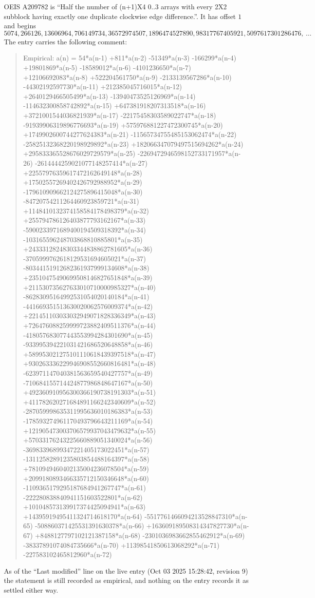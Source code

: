 \documentclass[11pt,a4paper]{article}
\theoremstyle{plain}
\theoremstyle{definition}
\begin{document}
OEIS A209782 is ``Half the number of (n+1)X4 0..3 arrays with every 2X2 subblock having exactly one duplicate clockwise edge difference.''. It has offset $1$ and begins
\[
5074, 266126, 13606964, 706149734, 36572974507, 1896474527890, 98317767405921, 5097617301286476,\ \dots
\]
The entry carries the following comment:
\begin{quote}\small
Empirical: a(n) = 54*a(n-1) +811*a(n-2) -51349*a(n-3) -166299*a(n-4) +19801869*a(n-5) -18589012*a(n-6) -4101236650*a(n-7) +12106692083*a(n-8) +522204561750*a(n-9) -2133139567286*a(n-10) -44302192597730*a(n-11) +212385045716015*a(n-12) +2640129466505499*a(n-13) -13940473525126969*a(n-14) -114632300858742892*a(n-15) +647381918207313518*a(n-16) +3721001544036821939*a(n-17) -22175458303589022747*a(n-18) -91939906319896776693*a(n-19) +575976881227472300745*a(n-20) +1749902600744277624383*a(n-21) -11565734755485153062474*a(n-22) -25825132368220198929892*a(n-23) +182066347079497515694262*a(n-24) +295833365528676029729579*a(n-25) -2269472946598152733171957*a(n-26) -2614444259021077148257414*a(n-27) +22557976359617472162649148*a(n-28) +17502557269402426792988952*a(n-29) -179610909662124275896415048*a(n-30) -84720754211264460923859721*a(n-31) +1148410132374158584178498379*a(n-32) +255794786126403877793162167*a(n-33) -5900233971689400194509318392*a(n-34) -103165596248703868810885801*a(n-35) +24333128248303344838862781605*a(n-36) -3705999762618129531694605021*a(n-37) -80344151912682361937999134608*a(n-38) +23510475490699508146827651848*a(n-39) +211530735627633010710000985327*a(n-40) -86283095164992531054020140184*a(n-41) -441669351513630020062576009374*a(n-42) +221451103033032949071828336349*a(n-43) +726476088259999723882409511376*a(n-44) -418057683077443553994284301690*a(n-45) -933995394221031421686520648858*a(n-46) +589953021275101110618439397518*a(n-47) +930263336229946908552660816481*a(n-48) -623971147040381563659540427757*a(n-49) -710684155714424877986848647167*a(n-50) +492360910956300366190738191303*a(n-51) +411782620271684891166242340609*a(n-52) -287059998635311995636010186383*a(n-53) -178593274961170493796643211169*a(n-54) +121905473003706579937043479632*a(n-55) +57033176243225660889051340024*a(n-56) -36983396899347221405173022451*a(n-57) -13112582891235803854488164397*a(n-58) +7810949460402135004236078504*a(n-59) +2099180893466335712150346648*a(n-60) -1109365179295187684941267747*a(n-61) -222280838840941151603522801*a(n-62) +101048573139917374425094941*a(n-63) +14395919495411324714618170*a(n-64) -5517761466094213528847310*a(n-65) -508860371425531391630378*a(n-66) +163609189508314347827730*a(n-67) +8488127797102121387158*a(n-68) -2301036983662855462912*a(n-69) -38337891074084735666*a(n-70) +11398541850613068292*a(n-71) -227583102465812960*a(n-72)
\end{quote}
As of the ``Last modified'' line on the live entry (Oct 03 2025 15:28:42, revision 9) the statement is
still recorded as empirical, and nothing on the entry records it as settled either way.
\end{document}

